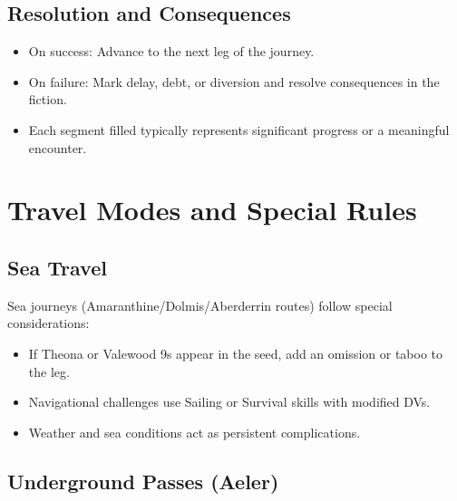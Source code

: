 \subsection{Resolution and Consequences}
\label{subsec:travel-resolution}

\begin{itemize}
\item On success: Advance to the next leg of the journey.
\item On failure: Mark delay, debt, or diversion and resolve consequences in the fiction.
\item Each segment filled typically represents significant progress or a meaningful encounter.
\end{itemize}

\section{Travel Modes and Special Rules}
\label{sec:travel-modes}

\subsection{Sea Travel}
\label{subsec:sea-travel}

Sea journeys (Amaranthine/Dolmis/Aberderrin routes) follow special considerations:
\begin{itemize}
\item If Theona or Valewood 9s appear in the seed, add an omission or taboo to the leg.
\item Navigational challenges use Sailing or Survival skills with modified DVs.
\item Weather and sea conditions act as persistent complications.
\end{itemize}

\subsection{Underground Passes (Aeler)}
\label{subsec:underways}


